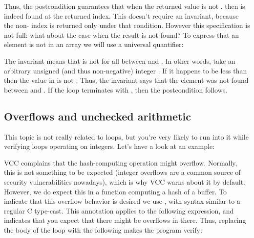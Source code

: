 {{\noindent
Thus, the postcondition guarantees that when the returned value
is not , then  is indeed found at the returned
index.
This doesn't require an invariant, because the non- index
is returned only under that condition.
However this specification is not full: what about the case when the result is not found?
To express that an element is not in an array we will use a universal quantifier:


\noindent
The invariant  means that 
 is not  for all  between  and .
In other words, take an arbitrary unsigned (and thus non-negative) integer . 
If it happens to be less than  then the value in  is not .
Thus, the invariant says that the element was not found between 
and .
If the loop terminates with , then the postcondition follows.

\subsection{Overflows and unchecked arithmetic}

This topic is not really related to loops, but you're very likely to run into it
while verifying loops operating on integers.
Let's have a look at an example:


\noindent
VCC complains that the hash-computing operation might overflow.
Normally, this is not something to be expected (integer overflows
are a common source of security vulnerabilities nowadays),
which is why VCC warns about it by default.
However, we do expect this in a function computing a hash of a buffer.
To indicate that this overflow behavior is desired we use ,
with syntax similar to a regular C type-cast.
This annotation applies to the following expression, and indicates that
you expect that there might be overflows in there.
Thus, replacing the body of the loop with the following
makes the program verify:


}}
